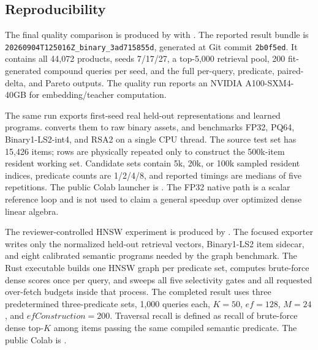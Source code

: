\subsection{Reproducibility}
The final quality comparison is produced by  with . The reported result bundle is \texttt{20260904T125016Z\_binary\_3ad715855d}, generated at Git commit \texttt{2b0f5ed}. It contains all 44,072 products, seeds 7/17/27, a top-5,000 retrieval pool, 200 fit-generated compound queries per seed, and the full per-query, predicate, paired-delta, and Pareto outputs. The quality run reports an NVIDIA A100-SXM4-40GB for embedding/teacher computation.

The same run exports first-seed real held-out representations and learned programs.  converts them to raw binary assets, and  benchmarks FP32, PQ64, Binary1-LS2-int4, and RSA2 on a single CPU thread. The source test set has 15,426 items; rows are physically repeated only to construct the 500k-item resident working set. Candidate sets contain 5k, 20k, or 100k sampled resident indices, predicate counts are 1/2/4/8, and reported timings are medians of five repetitions. The public Colab launcher is . The FP32 native path is a scalar reference loop and is not used to claim a general speedup over optimized dense linear algebra.

The reviewer-controlled HNSW experiment is produced by . The focused exporter  writes only the normalized held-out retrieval vectors, Binary1-LS2 item sidecar, and eight calibrated semantic programs needed by the graph benchmark. The Rust executable  builds one HNSW graph per predicate set, computes brute-force dense scores once per query, and sweeps all five selectivity gates and all requested over-fetch budgets inside that process. The completed result uses three predetermined three-predicate sets, 1,000 queries each, $K=50$, $ef=128$, $M=24$, and $efConstruction=200$. Traversal recall is defined as recall of brute-force dense top-$K$ among items passing the same compiled semantic predicate. The public Colab is .
